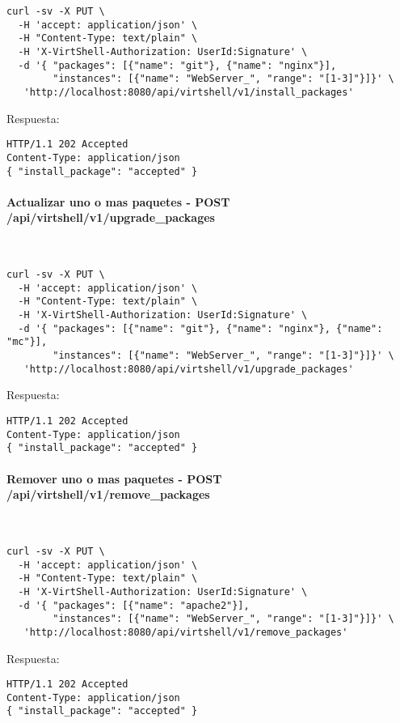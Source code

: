\begin{lstlisting}[style=json]
curl -sv -X PUT \
  -H 'accept: application/json' \
  -H "Content-Type: text/plain" \
  -H 'X-VirtShell-Authorization: UserId:Signature' \
  -d '{ "packages": [{"name": "git"}, {"name": "nginx"}],
        "instances": [{"name": "WebServer_", "range": "[1-3]"}]}' \
   'http://localhost:8080/api/virtshell/v1/install_packages'
\end{lstlisting}

\vspace{1cm}
Respuesta:
\vspace{1cm}

\begin{lstlisting}[style=json]
HTTP/1.1 202 Accepted
Content-Type: application/json
{ "install_package": "accepted" }
\end{lstlisting}

\paragraph{Actualizar uno o mas paquetes - POST \\ /api/virtshell/v1/upgrade\_packages} ~\\

\begin{lstlisting}[style=json]
curl -sv -X PUT \
  -H 'accept: application/json' \
  -H "Content-Type: text/plain" \
  -H 'X-VirtShell-Authorization: UserId:Signature' \
  -d '{ "packages": [{"name": "git"}, {"name": "nginx"}, {"name": "mc"}],
        "instances": [{"name": "WebServer_", "range": "[1-3]"}]}' \
   'http://localhost:8080/api/virtshell/v1/upgrade_packages'
\end{lstlisting}

\vspace{1cm}
Respuesta:
\vspace{1cm}

\begin{lstlisting}[style=json]
HTTP/1.1 202 Accepted
Content-Type: application/json
{ "install_package": "accepted" }
\end{lstlisting}

\paragraph{Remover uno o mas paquetes - POST \\ /api/virtshell/v1/remove\_packages} ~\\

\begin{lstlisting}[style=json]
curl -sv -X PUT \
  -H 'accept: application/json' \
  -H "Content-Type: text/plain" \
  -H 'X-VirtShell-Authorization: UserId:Signature' \
  -d '{ "packages": [{"name": "apache2"}],
        "instances": [{"name": "WebServer_", "range": "[1-3]"}]}' \
   'http://localhost:8080/api/virtshell/v1/remove_packages'
\end{lstlisting}

\vspace{1cm}
Respuesta:
\vspace{1cm}

\begin{lstlisting}[style=json]
HTTP/1.1 202 Accepted
Content-Type: application/json
{ "install_package": "accepted" }
\end{lstlisting}